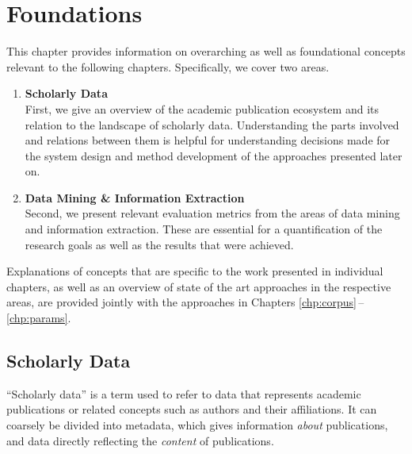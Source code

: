 \chapter{Foundations}
\label{chp:foundations}

This chapter provides information on overarching as well as foundational concepts relevant to the following chapters. Specifically, we cover two areas.

\begin{enumerate}
    \item \textbf{Scholarly Data}\\
        First, we give an overview of the academic publication ecosystem and its relation to the landscape of scholarly data. Understanding the parts involved and relations between them is helpful for understanding decisions made for the system design and method development of the approaches presented later on.
    \item \textbf{Data Mining \& Information Extraction}\\
        Second, we present relevant evaluation metrics from the areas of data mining and information extraction. These are essential for a quantification of the research goals as well as the results that were achieved.
\end{enumerate}

Explanations of concepts that are specific to the work presented in individual chapters, as well as an overview of state of the art approaches in the respective areas, are provided jointly with the approaches in Chapters \ref{chp:corpus}\,--\,\ref{chp:params}.

\section{Scholarly Data}



``Scholarly data'' is a term used to refer to data that represents academic publications or related concepts such as authors and their affiliations. It can coarsely be divided into metadata, which gives information \emph{about} publications, and data directly reflecting the \emph{content} of publications.

